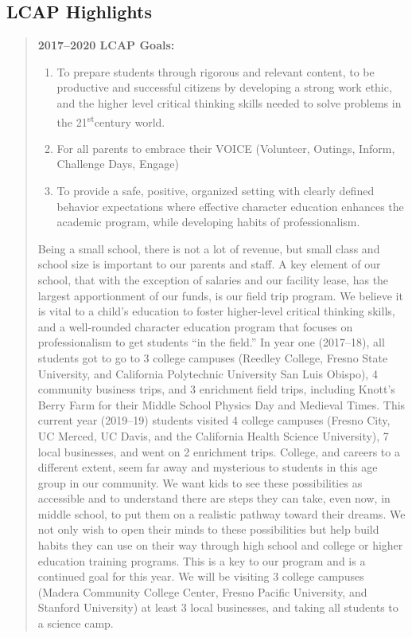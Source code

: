 \documentclass{article}
\newcommand{\st}{\textsuperscript{st}}
\newcounter{goal}[section] %
\begin{document}
\subsection{LCAP Highlights}
\begin{quotation}
	{\bf 2017--2020 LCAP Goals:}
	\begin{enumerate}
		\item To prepare students through rigorous and relevant content, to be productive and successful citizens by developing a strong work ethic, and the higher level critical thinking skills needed to solve problems in the 21\st century world.
		\item For all parents to embrace their VOICE (Volunteer, Outings, Inform, Challenge Days, Engage)
		\item To provide a safe, positive, organized setting with clearly defined behavior expectations where effective character education enhances the academic program, while developing habits of professionalism.
	\end{enumerate}
	Being a small school, there is not a lot of revenue, but small class and school size is important to our parents and staff. A key element of our school, that with the exception of salaries and our facility lease, has the largest apportionment of our funds, is our field trip program. We believe it is vital to a child's education to foster higher-level critical thinking skills, and a well-rounded character education program that focuses on professionalism to get students ``in the field.'' In year one (2017--18), all students got to go to 3 college campuses (Reedley College, Fresno State University, and California Polytechnic University San Luis Obispo), 4 community business trips, and 3 enrichment field trips, including Knott's Berry Farm for their Middle School Physics Day and Medieval Times. This current year (2019--19) students visited 4 college campuses (Fresno City, UC Merced, UC Davis, and the California Health Science University), 7 local businesses, and went on 2 enrichment trips. College, and careers to a different extent, seem far away and mysterious to students in this age group in our community. We want kids to see these possibilities as accessible and to understand there are steps they can take, even now, in middle school, to put them on a realistic pathway toward their dreams. We not only wish to open their minds to these possibilities but help build habits they can use on their way through high school and college or higher education training programs. This is a key to our program and is a continued goal for this year. We will be visiting 3 college campuses (Madera Community College Center, Fresno Pacific University, and Stanford University) at least 3 local businesses, and taking all students to a science camp.
\end{quotation}
\end{document}
